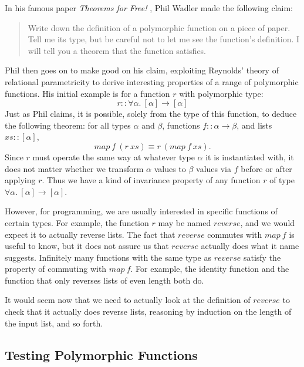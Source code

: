 \documentclass{llncs}
\begin{document}
In his famous paper \emph{Theorems for Free!}
\cite{DBLP:conf/fpca/Wadler89}, Phil Wadler made the following claim:
\begin{quotation}
  \noindent
  Write down the definition of a polymorphic function on a piece of
  paper. Tell me its type, but be careful not to let me see the
  function's definition. I will tell you a theorem that the function
  satisfies.
\end{quotation}
Phil then goes on to make good on his claim, exploiting Reynolds'
theory of relational parametricity \cite{DBLP:conf/ifip/Reynolds83} to
derive interesting properties of a range of polymorphic functions. His
initial example is for a function $r$ with polymorphic type:
\begin{displaymath}
  \mathit{r} :: \forall \alpha.~[\alpha] \to [\alpha]
\end{displaymath}
Just as Phil claims, it is possible, solely from the type of this
function, to deduce the following theorem: for all types $\alpha$ and
$\beta$, functions $f :: \alpha \to \beta$, and lists
$\mathit{xs} :: [\alpha]$,
\begin{displaymath}
  \mathit{map}~f~(\mathit{r}~\mathit{xs}) \equiv \mathit{r}~(\mathit{map}~f~\mathit{xs}).
\end{displaymath}
Since $\mathit{r}$ must operate the same way at whatever type $\alpha$
it is instantiated with, it does not matter whether we transform
$\alpha$ values to $\beta$ values via $f$ before or after applying
$\mathit{r}$. Thus we have a kind of invariance property of any
function $r$ of type $\forall \alpha.~[\alpha] \to [\alpha]$.

However, for programming, we are usually interested in specific
functions of certain types. For example, the function $r$ may be named
$\mathit{reverse}$, and we would expect it to actually reverse
lists. The fact that $\mathit{reverse}$ commutes with $\mathit{map}~f$
is useful to know, but it does not assure us that $\mathit{reverse}$
actually does what it name suggests. Infinitely many functions with
the same type as $\mathit{reverse}$ satisfy the property of commuting
with $\mathit{map}~f$. For example, the identity function and the
function that only reverses lists of even length both do.

It would seem now that we need to actually look at the definition of
$\mathit{reverse}$ to check that it actually does reverse lists,
reasoning by induction on the length of the input list, and so forth.

\subsection{Testing Polymorphic Functions}
\label{sec:intro-testing}
\end{document}
